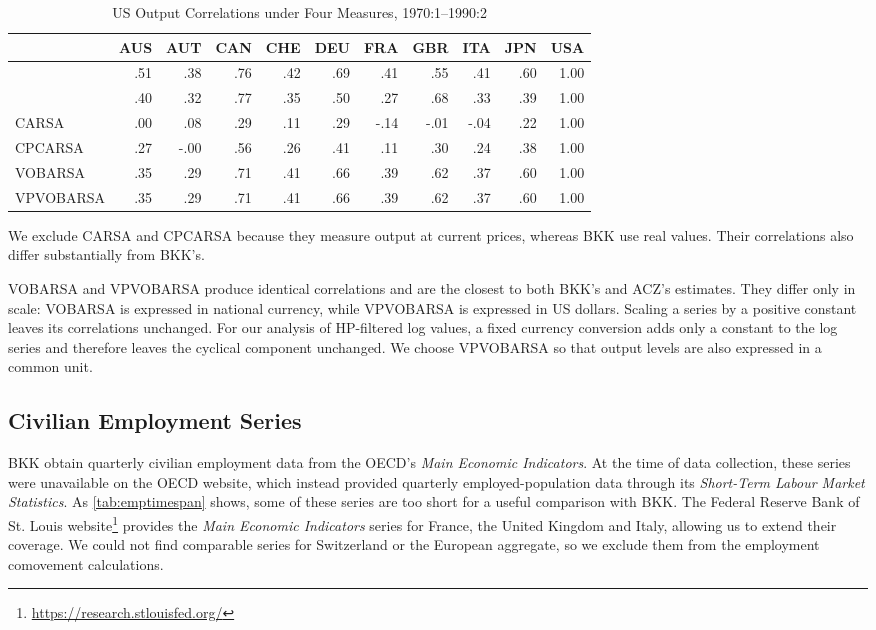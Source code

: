 \begin{table}[htbp]
  \centering
\begin{adjustbox}{max width=\textwidth}
\begin{tabular}{lrrrrrrrrrr}
  \toprule
 & AUS & AUT & CAN & CHE & DEU & FRA & GBR & ITA & JPN & USA \\
  \midrule
  \cite{Backus:1993aa} & .51 & .38 & .76 & .42 & .69 & .41 & .55 & .41 & .60 & 1.00 \\
\cite{Ambler:2004aa} & .40 & .32 & .77 & .35 & .50 & .27 & .68 & .33 & .39 & 1.00 \\
CARSA & .00 & .08 & .29 & .11 & .29 & -.14 & -.01 & -.04 & .22 & 1.00 \\
  CPCARSA & .27 & -.00 & .56 & .26 & .41 & .11 & .30 & .24 & .38 & 1.00 \\
  VOBARSA & .35 & .29 & .71 & .41 & .66 & .39 & .62 & .37 & .60 & 1.00 \\
  VPVOBARSA & .35 & .29 & .71 & .41 & .66 & .39 & .62 & .37 & .60 & 1.00 \\
   \bottomrule
\end{tabular}
\end{adjustbox}
\caption{US Output Correlations under Four Measures, 1970:1--1990:2}
\label{tab:measure}
\end{table}

We exclude CARSA and CPCARSA because they measure output at current prices, whereas BKK use real values. Their correlations also differ substantially from BKK's.

VOBARSA and VPVOBARSA produce identical correlations and are the closest to both BKK's and ACZ's estimates. They differ only in scale: VOBARSA is expressed in national currency, while VPVOBARSA is expressed in US dollars. Scaling a series by a positive constant leaves its correlations unchanged. For our analysis of HP-filtered log values, a fixed currency conversion adds only a constant to the log series and therefore leaves the cyclical component unchanged. We choose VPVOBARSA so that output levels are also expressed in a common unit.

\subsection{Civilian Employment Series \label{app:employment}}

BKK obtain quarterly civilian employment data from the OECD's \textit{Main Economic Indicators}. At the time of data collection, these series were unavailable on the OECD website, which instead provided quarterly employed-population data through its \textit{Short-Term Labour Market Statistics}. As \cref{tab:emptimespan} shows, some of these series are too short for a useful comparison with BKK. The Federal Reserve Bank of St. Louis website\footnote{\url{https://research.stlouisfed.org/}} provides the \textit{Main Economic Indicators} series for France, the United Kingdom and Italy, allowing us to extend their coverage. We could not find comparable series for Switzerland or the European aggregate, so we exclude them from the employment comovement calculations.

